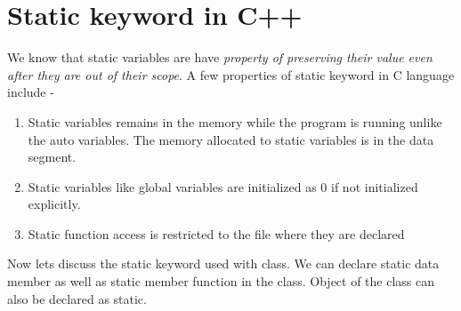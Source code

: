 \documentclass[oops.tex]{subfiles}
\begin{document}
\section{Static keyword in C++}

We know that static variables are have \emph{property of preserving their value 
even after they are out of their scope}. A few properties of static keyword in
C language include - 
\begin{enumerate}
    \item Static variables remains in the memory while the program is running
          unlike the auto variables. The memory allocated to static variables
          is in the data segment.
    \item Static variables like global variables are initialized as 0 if not
          initialized explicitly.
    \item Static function access is restricted to the file where they are declared 
\end{enumerate}

Now lets discuss the static keyword used with class. We can declare static
data member as well as static member function in the class. Object of the class
can also be declared as static.
\end{document}

